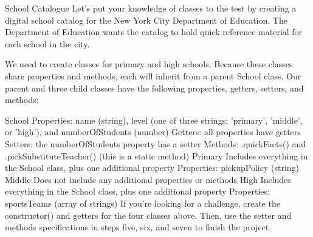 School Catalogue
    Let’s put your knowledge of classes to the test by creating a digital school catalog for the New York City Department of Education. The Department of Education wants the catalog to hold quick reference material for each school in the city.

    We need to create classes for primary and high schools. Because these classes share properties and methods, each will inherit from a parent School class. Our parent and three child classes have the following properties, getters, setters, and methods:

    School
        Properties: name (string), level (one of three strings: 'primary', 'middle', or 'high'), and numberOfStudents (number)
        Getters: all properties have getters
        Setters: the numberOfStudents property has a setter
        Methods: .quickFacts() and .pickSubstituteTeacher() (this is a static method)
    Primary
        Includes everything in the School class, plus one additional property
        Properties: pickupPolicy (string)
        Middle
        Does not include any additional properties or methods
    High
        Includes everything in the School class, plus one additional property
        Properties: sportsTeams (array of strings)
        If you’re looking for a challenge, create the constructor() and getters for the four classes above. Then, use the setter and methods specifications in steps five, six, and seven to finish the project.